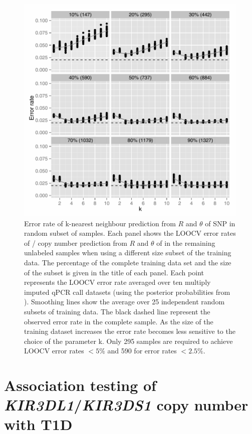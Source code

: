 \begin{figure}[h!]
  \centering
  \includegraphics[scale=.5]{figures/Figure-4.pdf}
  {Error rate of k-nearest neighbour prediction from $R$ and $\theta$ of SNP  in random subset of samples.}
  { Each panel shows the LOOCV error rates of / copy number prediction
  from $R$ and $\theta$ of  in the remaining unlabeled samples
  when using a different size subset of the training data.
  The percentage of the complete training data set and the size of the subset is given in the title of each panel.
  Each point represents the LOOCV error rate averaged over ten multiply imputed qPCR call datasets
  (using the posterior probabilities from ). 
  Smoothing lines show the average over 25 independent random subsets of training data.
  The black dashed line represent the observed error rate in the complete sample.
  As the size of the training dataset increases the error rate becomes less sensitive to the choice of the parameter k.
  Only 295 samples are required to achieve LOOCV error rates $<5\%$ and 590 for error rates $<2.5\%$. }
\end{figure}

\section{Association testing of \emph{KIR3DL1}/\emph{KIR3DS1} copy number with T1D}

